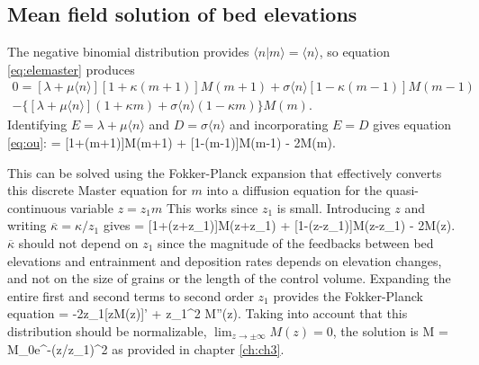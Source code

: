 \subsection{Mean field solution of bed elevations}

The negative binomial distribution provides $\langle n |m \rangle = \langle n \rangle$, so equation \ref{eq:elemaster} produces
\begin{multline} 0 = [\lambda + \mu \langle n \rangle][1+\kappa(m+1)]M(m+1) + \sigma \langle n \rangle [1-\kappa(m-1)]M(m-1) \\- \{[\lambda + \mu \langle n \rangle](1+\kappa m) + \sigma \langle n \rangle (1-\kappa m) \}M(m). \end{multline}
Identifying $E=\lambda + \mu \langle n \rangle$ and $D = \sigma \langle n \rangle$ and incorporating $E=D$ gives equation \ref{eq:ou}:
 = [1+\kappa(m+1)]M(m+1) + [1-\kappa(m-1)]M(m-1) - 2M(m).\ee

This can be solved using the Fokker-Planck expansion \citep{Gardiner1983} that effectively converts this discrete Master equation for $m$ into a diffusion equation for the quasi-continuous variable $z=z_1 m$ This works since $z_1$ is small. Introducing $z$ and writing $\overline{\kappa}=\kappa/z_1$ gives
 = [1+\overline{\kappa}(z+z_1)]M(z+z_1) + [1-\overline{\kappa}(z-z_1)]M(z-z_1) - 2M(z).\ee
$\overline{\kappa}$ should not depend on $z_1$ since the magnitude of the feedbacks between bed elevations and entrainment and deposition rates depends on elevation changes, and not on the size of grains or the length of the control volume.
Expanding the entire first and second terms to second order $z_1$ provides the Fokker-Planck equation
 = -2\overline{\kappa}z_1[zM(z)]' + z_1^2 M''(z). \ee
Taking into account that this distribution should be normalizable, $\lim_{z\rightarrow \pm \infty}M(z) = 0$, the solution is
\be M = M_0e^{-\kappa (z/z_1)^2}\ee
as provided in chapter \ref{ch:ch3}.

